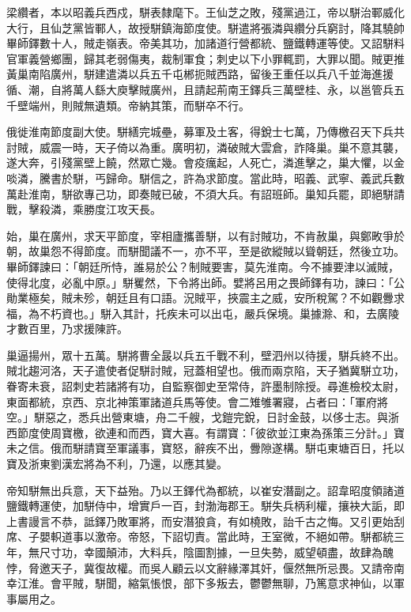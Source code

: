 \begin{pinyinscope}
 梁纘者，本以昭義兵西戍，駢表隸麾下。王仙芝之敗，殘黨過江，帝以駢治鄆威化大行，且仙芝黨皆鄆人，故授駢鎮海節度使。駢遣將張潾與纘分兵窮討，降其驍帥畢師鐸數十人，賊走嶺表。帝美其功，加諸道行營都統、鹽鐵轉運等使。又詔駢料官軍義營鄉團，歸其老弱傷夷，裁制軍食；刺史以下小罪輒罰，大罪以聞。賊更推黃巢南陷廣州，駢建遣潾以兵五千屯郴扼賊西路，留後王重任以兵八千並海進援循、潮，自將萬人繇大庾擊賊廣州，且請起荊南王鐸兵三萬壁桂、永，以邕管兵五千壁端州，則賊無遺類。帝納其策，而駢卒不行。



 俄徙淮南節度副大使。駢繕完城壘，募軍及土客，得銳士七萬，乃傳檄召天下兵共討賊，威震一時，天子倚以為重。廣明初，潾破賊大雲倉，詐降巢。巢不意其襲，遂大奔，引殘黨壁上饒，然眾亡幾。會疫癘起，人死亡，潾進擊之，巢大懼，以金啖潾，騰書於駢，丐歸命。駢信之，許為求節度。當此時，昭義、武寧、義武兵數萬赴淮南，駢欲專己功，即奏賊已破，不須大兵。有詔班師。巢知兵罷，即絕駢請戰，擊殺潾，乘勝度江攻天長。



 始，巢在廣州，求天平節度，宰相廬攜善駢，以有討賊功，不肯赦巢，與鄭畋爭於朝，故巢怨不得節度。而駢聞議不一，亦不平，至是欲縱賊以聳朝廷，然後立功。畢師鐸諫曰：「朝廷所恃，誰易於公？制賊要害，莫先淮南。今不據要津以滅賊，使得北度，必亂中原。」駢矍然，下令將出師。嬖將呂用之畏師鐸有功，諫曰：「公勛業極矣，賊未殄，朝廷且有口語。況賊平，挾震主之威，安所稅駕？不如觀釁求福，為不朽資也。」駢入其計，托疾未可以出屯，嚴兵保境。巢據滁、和，去廣陵才數百里，乃求援陳許。



 巢逼揚州，眾十五萬。駢將曹全晸以兵五千戰不利，壁泗州以待援，駢兵終不出。賊北趨河洛，天子遣使者促駢討賊，冠蓋相望也。俄而兩京陷，天子猶冀駢立功，眷寄未衰，詔刺史若諸將有功，自監察御史至常侍，許墨制除授。尋進檢校太尉，東面都統，京西、京北神策軍諸道兵馬等使。會二雉雊署寢，占者曰：「軍府將空。」駢惡之，悉兵出營東塘，舟二千艘，戈鎧完銳，日討金鼓，以侈士志。與浙西節度使周寶檄，欲連和而西，寶大喜。有謂寶：「彼欲並江東為孫策三分計。」寶未之信。俄而駢請寶至軍議事，寶怒，辭疾不出，釁隙遂構。駢屯東塘百日，托以寶及浙東劉漢宏將為不利，乃還，以應其變。



 帝知駢無出兵意，天下益殆。乃以王鐸代為都統，以崔安潛副之。詔韋昭度領諸道鹽鐵轉運使，加駢侍中，增實戶一百，封渤海郡王。駢失兵柄利權，攘袂大詬，即上書謾言不恭，詆鐸乃敗軍將，而安潛狼貪，有如橈敗，詒千古之悔。又引更始刮席、子嬰軹道事以激帝。帝怒，下詔切責。當此時，王室微，不絕如帶。駢都統三年，無尺寸功，幸國顛沛，大料兵，陰圖割據，一旦失勢，威望頓盡，故肆為醜悖，脅邀天子，冀復故權。而吳人顧云以文辭緣澤其奸，偃然無所忌畏。又請帝南幸江淮。會平賊，駢聞，縮氣悵恨，部下多叛去，鬱鬱無聊，乃篤意求神仙，以軍事屬用之。




\end{pinyinscope}
